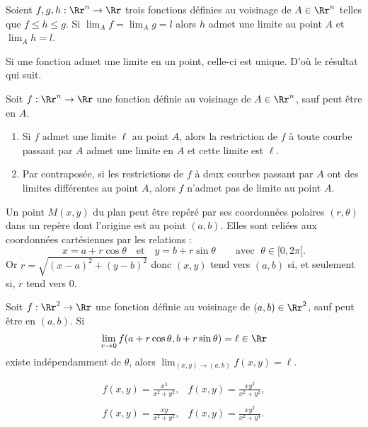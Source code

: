 \documentclass[class=report,crop=false]{standalone}
\begin{document}
\vskip6mm

\begin{theoreme} Soient $f,g,h:\Rr^n\to \Rr$ trois fonctions définies au voisinage de $A\in \Rr^n$ telles que $f\leq h\leq g$. Si $\displaystyle \lim _{A}f=\lim _{A}g=l$ alors $h$ admet une limite au point $A$ et $\displaystyle \lim _{A}h=l$.
\end{theoreme}

\vskip4mm

\noindent Si une fonction admet une limite en un point, celle-ci est unique. D'o\`u le résultat qui suit.

\vskip6mm

\begin{proposition} Soit $f:\Rr^n\to \Rr$ une fonction définie au voisinage de $A\in \Rr^n$, sauf peut \^etre en $A$.
\begin{enumerate}
\item Si $f$ admet une limite $\ell$ au point $A$, alors la restriction de $f$ à toute courbe passant par $A$ admet une limite en $A$ et cette limite est $\ell$.
\item Par contraposée, si les restrictions de $f$ à deux courbes passant par $A$ ont des limites différentes au point $A$, alors $f$ n'admet pas de limite au point $A$.
\end{enumerate}
\end{proposition}

\vskip6mm

\noindent Un point $M(x,y)$ du plan peut \^etre repéré par ses coordonnées polaires $(r,\theta)$ dans un repère dont l'origine est au point $(a,b)$. Elles sont reliées aux coordonnées cartésiennes par les relations :
$$x=a+r\cos \theta \quad \mbox{et}\quad y=b+r\sin \theta \qquad \mbox{avec }\; \theta \in [0,2\pi [.$$
Or $r=\sqrt{(x-a)^2+(y-b)^2}$ donc $(x,y)$ tend vers $(a,b)$ si, et seulement si, $r$ tend vers $0$.

\vskip6mm

\begin{theoreme}Soit $f:\Rr^2\to \Rr$ une fonction définie au voisinage de $(a,b)\in \Rr^2$, sauf peut \^etre en $(a,b)$. Si
$$\lim _{r\to 0}f(a+r\cos \theta ,b+r\sin \theta )=\ell \in \Rr$$
existe indépendamment de $\theta$, alors $\displaystyle \lim _{(x,y)\to (a,b)}f(x,y)=\ell$.
\end{theoreme}

\vskip6mm

$$\begin{array}{ll}\displaystyle f(x,y)=\frac{x^3}{x^2+y^2},&\displaystyle f(x,y)=\frac{xy^2}{x^2+y^2},\\ \\ \displaystyle f(x,y)=\frac{xy}{x^2+y^2},&\displaystyle f(x,y)=\frac{xy^2}{x^2+y^4}.\end{array}$$
\end{document}
